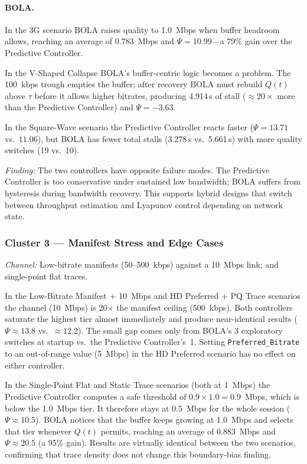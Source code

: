 \documentclass[conference]{IEEEtran}
\begin{document}
\paragraph{BOLA.}
In the 3G scenario BOLA raises quality to 1.0~Mbps when buffer headroom
allows, reaching an average of 0.783~Mbps and $\Psi=10.99$---a 79\%
gain over the Predictive Controller.

In the V-Shaped Collapse BOLA's buffer-centric logic becomes a problem.
The 100~kbps trough empties the buffer; after recovery BOLA must rebuild
$Q(t)$ above $\tau$ before it allows higher bitrates, producing 4.914\,s
of stall ($\approx\!20\times$ more than the Predictive Controller) and
$\Psi=-3.63$.

In the Square-Wave scenario the Predictive Controller reacts faster
($\Psi=13.71$ vs.~$11.06$), but BOLA has fewer total stalls (3.278\,s
vs.~5.661\,s) with more quality switches (19 vs.~10).

\textit{Finding:} The two controllers have opposite failure modes.  The
Predictive Controller is too conservative under sustained low bandwidth;
BOLA suffers from hysteresis during bandwidth recovery.  This supports
hybrid designs that switch between throughput estimation and Lyapunov
control depending on network state.

\subsubsection{Cluster 3 — Manifest Stress and Edge Cases}

\textit{Channel:} Low-bitrate manifests (50--500~kbps) against a
10~Mbps link; and single-point flat traces.

In the Low-Bitrate Manifest + 10~Mbps and HD Preferred + PQ Trace
scenarios the channel (10~Mbps) is 20$\times$ the manifest ceiling
(500~kbps).  Both controllers saturate the highest tier almost
immediately and produce near-identical results
($\Psi\approx13.8$ vs.\ $\approx12.2$).  The small gap comes only
from BOLA's 3 exploratory switches at startup vs.~the Predictive
Controller's~1.  Setting \texttt{Preferred\_Bitrate} to an out-of-range
value (5~Mbps) in the HD Preferred scenario has no effect on either
controller.

In the Single-Point Flat and Static Trace scenarios (both at 1~Mbps)
the Predictive Controller computes a safe threshold of
$0.9\times1.0=0.9$~Mbps, which is below the 1.0~Mbps tier.  It
therefore stays at 0.5~Mbps for the whole session ($\Psi\approx10.5$).
BOLA notices that the buffer keeps growing at 1.0~Mbps and selects
that tier whenever $Q(t)$ permits, reaching an average of 0.883~Mbps
and $\Psi\approx20.5$ (a 95\% gain).  Results are virtually identical
between the two scenarios, confirming that trace density does not
change this boundary-bias finding.
\end{document}
